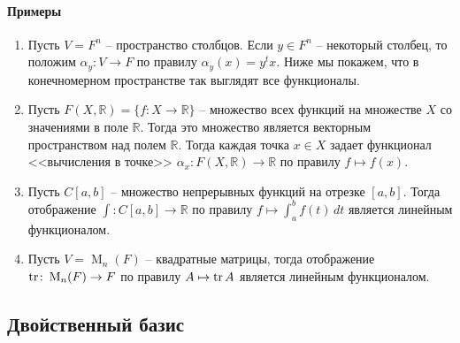 \paragraph{Примеры}

\begin{enumerate}
\item Пусть $V = F^n$ -- пространство столбцов.
Если $y\in F^n$ -- некоторый столбец, то положим $\alpha_y \colon V\to F$ по правилу $\alpha_y(x) = y^t x$.
Ниже мы покажем, что в конечномерном пространстве так выглядят все функционалы.

\item Пусть $F(X, \mathbb R) = \{f\colon X\to \mathbb R\}$ -- множество всех функций на множестве $X$ со значениями в поле $\mathbb R$.
Тогда это множество является векторным пространством над полем $\mathbb R$.
Тогда каждая точка $x\in X$ задает функционал <<вычисления в точке>> $\alpha_x \colon F(X,\mathbb R)\to \mathbb R$ по правилу $f\mapsto f(x)$.

\item Пусть $C[a,b]$ -- множество непрерывных функций на отрезке $[a,b]$.
Тогда отображение $\int \colon C[a,b]\to \mathbb R$ по правилу $f \mapsto \int_a^b f(t)\,dt$ является линейным функционалом.

\item Пусть $V = \operatorname{M}_n(F)$ -- квадратные матрицы, тогда отображение $\operatorname{tr}\colon \operatorname{M}_n(F)\to F$ по правилу $A\mapsto \operatorname{tr} A$ является линейным функционалом.
\end{enumerate}




\subsection{Двойственный базис}

